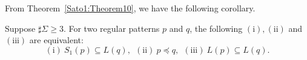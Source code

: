 
From Theorem~\ref{Sato1:Theorem10},%
we have the following corollary.
\begin{col}
    Suppose $\sharp\Sigma \geq 3$.
    For two regular patterns $p$ and $q$,
    the following $(\mathrm{i}), (\mathrm{ii})$ and $(\mathrm{iii})$ are equivalent:
    \[
        (\mathrm{i})\ S_{1}(p) \subseteq L(q),\ \
        (\mathrm{ii})\ p \preceq q,\ \
        (\mathrm{iii})\ L(p) \subseteq L(q).
    \]
\end{col}